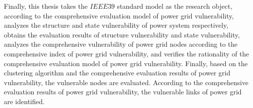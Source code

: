 \begin{eabstract}
  Finally, this thesis takes the $IEEE39$ standard model as the research object, according to the comprehensive evaluation model of power grid vulnerability, 
  analyzes the structure and state vulnerability of power system respectively, obtains the evaluation results of structure vulnerability and state vulnerability, analyzes 
  the comprehensive vulnerability of power grid nodes according to the comprehensive index of power grid vulnerability, and verifies the rationality of the comprehensive 
  evaluation model of power grid vulnerability. Finally, based on the clustering algorithm and the comprehensive evaluation results of power grid vulnerability, the 
  vulnerable nodes are evaluated. According to the comprehensive evaluation results of power grid vulnerability, the vulnerable links of power grid are identified.

\end{eabstract}


